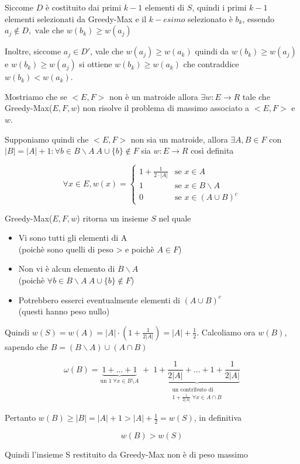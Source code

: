 Siccome $D$ è costituito dai primi $k-1$ elementi di $S$, quindi i primi $k-1$ elementi selezionati da Greedy-Max e il $k-esimo$ selezionato è $b_k$, essendo $a_j \not \in D, \text{ vale che } w(b_k) \geq w(a_j)$

Inoltre, siccome $a_j \in D'$, vale che $w(a_j) \geq w(a_k)$ quindi da $w(b_k) \geq w(a_j)$ e  $w(b_k) \geq w(a_j)$ si ottiene $w(b_k) \geq w(a_k)$ che contraddice $w(b_k) < w(a_k)$.

Mostriamo che se $<E,F>$ non è un matroide allora $\exists w:E \to R$ tale che Greedy-Max($E,F,w$) non risolve il problema di massimo associato a $<E,F>$ e $w$.

Supponiamo quindi che $<E,F>$ non sia un matroide, allora $\exists A,B \in F$ con $|B|=|A|+1 : \forall b \in B \backslash A\ A \cup \{b\} \not \in F$ sia $w:E \to R$ così definita

{
    \large
    $$
        \forall x \in E, w(x) = 
        \begin{cases}
            1 + \frac{1}{2 \cdot |A|} & \text{se } x \in A \\
            1 & \text{se } x \in B \backslash A \\
            0 & \text{se } x \in (A \cup B)^c
        \end{cases}
    $$
}

Greedy-Max($E,F,w$) ritorna un insieme $S$ nel quale
\begin{itemize}
    \item Vi sono tutti gli elementi di A \\
    (poichè sono quelli di peso > e poichè $A \in F$)

    \item Non vi è alcun elemento di $B \backslash A$\\
    (poichè $\forall b \in B \backslash A\ A \cup \{b\} \not \in F$)

    \item Potrebbero esserci eventualmente elementi di $(A \cup B)^c$\\
    (questi hanno peso nullo)
\end{itemize}

Quindi $w(S)=w(A)=|A| \cdot (1+\frac{1}{2|A|}) = |A|+\frac{1}{2}$. Calcoliamo ora $w(B)$, sapendo che $B=(B \backslash A) \cup (A \cap B)$

\[
    \omega(B) = \underbrace{1 + \dots + 1}_{\text{un } 1 \; \forall x \in B \setminus A} 
    \;+\; 
    \underbrace{1 + \frac{1}{2|A|} + \dots + 1 + \frac{1}{2|A|}}_{\substack{\text{un contributo di} \\ 1 + \frac{1}{2|A|} \; \forall x \in A \cap B}}
\]

Pertanto $w(B) \geq |B| = |A| + 1 > |A| + \frac{1}{2} = w(S)$, in definitiva

{
    \large
    $$
        w(B) > w(S)
    $$
}

Quindi l'insieme S restituito da Greedy-Max non è di peso massimo